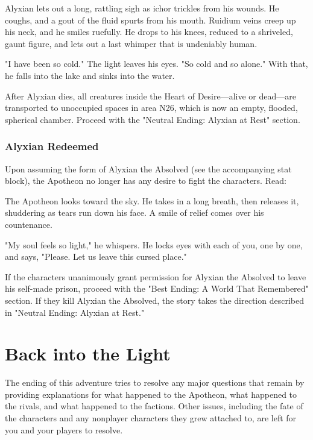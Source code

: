 \documentclass[10pt,a4paper,twoside,bg=print,twocolumn,openany,nodeprecatedcode]{dndbook}
\begin{document}
\begin{DndReadAloud}{}
Alyxian lets out a long, rattling sigh as ichor trickles from his wounds. He coughs, and a gout of the fluid spurts from his mouth. Ruidium veins creep up his neck, and he smiles ruefully. He drops to his knees, reduced to a shriveled, gaunt figure, and lets out a last whimper that is undeniably human.

"I have been so cold." The light leaves his eyes. "So cold and so alone." With that, he falls into the lake and sinks into the water.

\end{DndReadAloud}

After Alyxian dies, all creatures inside the Heart of Desire—alive or dead—are transported to unoccupied spaces in area N26, which is now an empty, flooded, spherical chamber. Proceed with the "Neutral Ending: Alyxian at Rest" section.

\subsubsection{Alyxian Redeemed}
Upon assuming the form of Alyxian the Absolved (see the accompanying stat block), the Apotheon no longer has any desire to fight the characters. Read:

\begin{DndReadAloud}{}
The Apotheon looks toward the sky. He takes in a long breath, then releases it, shuddering as tears run down his face. A smile of relief comes over his countenance.

"My soul feels so light," he whispers. He locks eyes with each of you, one by one, and says, "Please. Let us leave this cursed place."

\end{DndReadAloud}

If the characters unanimously grant permission for Alyxian the Absolved to leave his self-made prison, proceed with the "Best Ending: A World That Remembered" section. If they kill Alyxian the Absolved, the story takes the direction described in "Neutral Ending: Alyxian at Rest."



\section{Back into the Light}
The ending of this adventure tries to resolve any major questions that remain by providing explanations for what happened to the Apotheon, what happened to the rivals, and what happened to the factions. Other issues, including the fate of the characters and any nonplayer characters they grew attached to, are left for you and your players to resolve.
\end{document}
